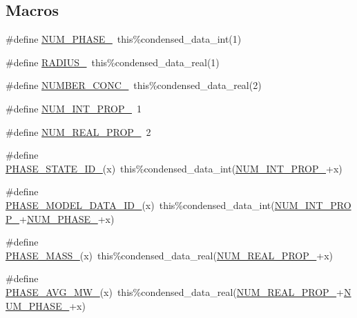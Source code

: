 \subsection*{Macros}
\begin{DoxyCompactItemize}
\item 
\#define \mbox{\hyperlink{aero__rep__single__particle_8_f90_aff1191174604af4c86c622f98cd18c17}{N\+U\+M\+\_\+\+P\+H\+A\+S\+E\+\_\+}}~this\%condensed\+\_\+data\+\_\+int(1)
\item 
\#define \mbox{\hyperlink{aero__rep__single__particle_8_f90_a15f72f113b57b98e7abc30f8f6097f49}{R\+A\+D\+I\+U\+S\+\_\+}}~this\%condensed\+\_\+data\+\_\+real(1)
\item 
\#define \mbox{\hyperlink{aero__rep__single__particle_8_f90_a1ca75523f9eec654c53c42b55395b12d}{N\+U\+M\+B\+E\+R\+\_\+\+C\+O\+N\+C\+\_\+}}~this\%condensed\+\_\+data\+\_\+real(2)
\item 
\#define \mbox{\hyperlink{aero__rep__single__particle_8_f90_a13ba1b28e3d8a5e60eec52ce6bbabe4f}{N\+U\+M\+\_\+\+I\+N\+T\+\_\+\+P\+R\+O\+P\+\_\+}}~1
\item 
\#define \mbox{\hyperlink{aero__rep__single__particle_8_f90_aa9808eb54fa06bcf890dd1aa1fc6ca5b}{N\+U\+M\+\_\+\+R\+E\+A\+L\+\_\+\+P\+R\+O\+P\+\_\+}}~2
\item 
\#define \mbox{\hyperlink{aero__rep__single__particle_8_f90_a07ea549f36f691ae067d983b25bd430a}{P\+H\+A\+S\+E\+\_\+\+S\+T\+A\+T\+E\+\_\+\+I\+D\+\_\+}}(x)~this\%condensed\+\_\+data\+\_\+int(\mbox{\hyperlink{rxn__arrhenius_8_f90_a13ba1b28e3d8a5e60eec52ce6bbabe4f}{N\+U\+M\+\_\+\+I\+N\+T\+\_\+\+P\+R\+O\+P\+\_\+}}+x)
\item 
\#define \mbox{\hyperlink{aero__rep__single__particle_8_f90_a4a3d5932c356a11e4d570ffda6c16f61}{P\+H\+A\+S\+E\+\_\+\+M\+O\+D\+E\+L\+\_\+\+D\+A\+T\+A\+\_\+\+I\+D\+\_\+}}(x)~this\%condensed\+\_\+data\+\_\+int(\mbox{\hyperlink{rxn__arrhenius_8_f90_a13ba1b28e3d8a5e60eec52ce6bbabe4f}{N\+U\+M\+\_\+\+I\+N\+T\+\_\+\+P\+R\+O\+P\+\_\+}}+\mbox{\hyperlink{aero__rep__single__particle_8_f90_aff1191174604af4c86c622f98cd18c17}{N\+U\+M\+\_\+\+P\+H\+A\+S\+E\+\_\+}}+x)
\item 
\#define \mbox{\hyperlink{aero__rep__single__particle_8_f90_a0148f29e0c084e75c8403c9f6d2c6fce}{P\+H\+A\+S\+E\+\_\+\+M\+A\+S\+S\+\_\+}}(x)~this\%condensed\+\_\+data\+\_\+real(\mbox{\hyperlink{rxn__arrhenius_8_f90_aa9808eb54fa06bcf890dd1aa1fc6ca5b}{N\+U\+M\+\_\+\+R\+E\+A\+L\+\_\+\+P\+R\+O\+P\+\_\+}}+x)
\item 
\#define \mbox{\hyperlink{aero__rep__single__particle_8_f90_a90c5e38122639c98f866ec2e284ed255}{P\+H\+A\+S\+E\+\_\+\+A\+V\+G\+\_\+\+M\+W\+\_\+}}(x)~this\%condensed\+\_\+data\+\_\+real(\mbox{\hyperlink{rxn__arrhenius_8_f90_aa9808eb54fa06bcf890dd1aa1fc6ca5b}{N\+U\+M\+\_\+\+R\+E\+A\+L\+\_\+\+P\+R\+O\+P\+\_\+}}+\mbox{\hyperlink{aero__rep__single__particle_8_f90_aff1191174604af4c86c622f98cd18c17}{N\+U\+M\+\_\+\+P\+H\+A\+S\+E\+\_\+}}+x)
\end{DoxyCompactItemize}
